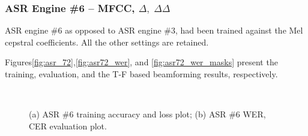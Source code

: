 \subsubsection{ASR Engine \#6 -- MFCC, \(\Delta,\;\Delta\Delta\)}
ASR engine \#6 as opposed to ASR engine \#3, had been trained against
the Mel cepstral coefficients. All the other settings are retained.

\bigskip

Figures\;\ref{fig:asr_72},\;\ref{fig:asr72_wer}, and \ref{fig:asr72_wer_masks}
present the training, evaluation, 
and the T-F based beamforming results, respectively. 
\begin{figure}[H]
    \centering
    \\
    \vspace{-0.3cm}
    \caption{(a) ASR \#6 training accuracy and loss plot;\;\;
        (b) ASR \#6 WER, CER evaluation plot.}\label{fig:asr72_wer_subplot} 
\end{figure}

